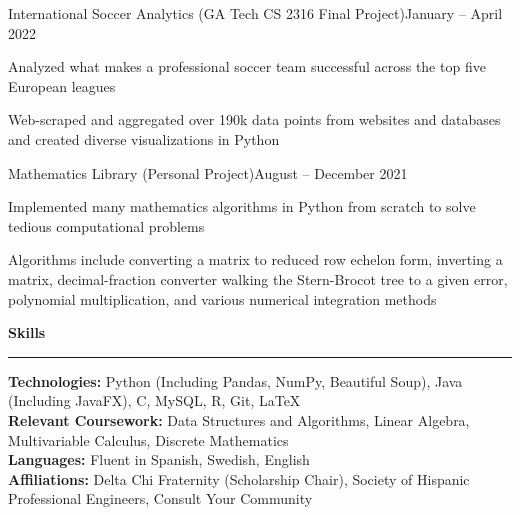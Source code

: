 \documentclass{article}
\newcommand{\horizontal}{\vspace{2pt}\hrule}
\newcommand{\sectitle}[1]{\vspace{2pt} \textbf{\large #1} \horizontal}
\newcommand{\skill}[2]{\textbf{#1:} #2}
\begin{document}
\begin{flushleft}
    \begin{subexperience}{International Soccer Analytics (GA Tech CS 2316 Final Project)}{January -- April 2022}
        \item Analyzed what makes a professional soccer team successful across the top five European leagues
        \item Web-scraped and aggregated over 190k data points from websites and databases and created diverse visualizations in Python
    \end{subexperience}

    \begin{subexperience}{Mathematics Library (Personal Project)}{August -- December 2021}
        \item Implemented many mathematics algorithms in Python from scratch to solve tedious computational problems
        \item Algorithms include converting a matrix to reduced row echelon form, inverting a matrix, decimal-fraction converter walking the Stern-Brocot tree to a given error, polynomial multiplication, and various numerical integration methods
    \end{subexperience}

\sectitle{Skills}

    \vspace{3pt}
    \skill{Technologies}{Python (Including Pandas, NumPy, Beautiful Soup), Java (Including JavaFX), C, MySQL, R, Git, LaTeX} \\
    \skill{Relevant Coursework}{Data Structures and Algorithms, Linear Algebra, Multivariable Calculus, Discrete Mathematics} \\
    \skill{Languages}{Fluent in Spanish, Swedish, English} \\
    \skill{Affiliations}{Delta Chi Fraternity (Scholarship Chair), Society of Hispanic Professional Engineers, Consult Your Community}

\end{flushleft}
\end{document}
